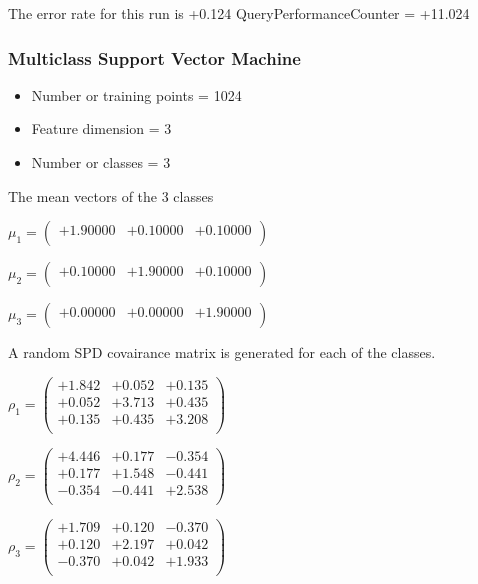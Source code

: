 \documentclass[12pt]{article}
\theoremstyle{definition}
\theoremstyle{remark}
\numberwithin{equation}{section}
\begin{document}
The error rate for this run is +0.124\newline
QueryPerformanceCounter  =  +11.024
\subsubsection{Multiclass Support Vector Machine }
\begin{itemize}
\item Number or training points = 1024
\item Feature dimension = 3
\item Number or classes = 3
\end{itemize}
{The mean vectors of the 3 classes}

$\mu_1 = \left(
\begin{array}{
ccc}
+1.90000 & +0.10000 & +0.10000 \\
\end{array}
\right)$

$\mu_2 = \left(
\begin{array}{
ccc}
+0.10000 & +1.90000 & +0.10000 \\
\end{array}
\right)$

$\mu_3 = \left(
\begin{array}{
ccc}
+0.00000 & +0.00000 & +1.90000 \\
\end{array}
\right)$

A random SPD covairance matrix is generated for each of the classes.\newline

$\rho_1 = \left(
\begin{array}{
ccc}
+1.842 & +0.052 & +0.135 \\
+0.052 & +3.713 & +0.435 \\
+0.135 & +0.435 & +3.208 \\
\end{array}
\right)$

$\rho_2 = \left(
\begin{array}{
ccc}
+4.446 & +0.177 & -0.354 \\
+0.177 & +1.548 & -0.441 \\
-0.354 & -0.441 & +2.538 \\
\end{array}
\right)$

$\rho_3 = \left(
\begin{array}{
ccc}
+1.709 & +0.120 & -0.370 \\
+0.120 & +2.197 & +0.042 \\
-0.370 & +0.042 & +1.933 \\
\end{array}
\right)$
\end{document}
